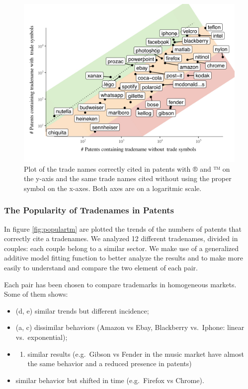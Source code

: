 \documentclass[b5paper,]{book}
\providecommand{\tightlist}{%
  \setlength{\itemsep}{0pt}\setlength{\parskip}{0pt}}
\theoremstyle{definition}
\theoremstyle{definition}
\theoremstyle{definition}
\theoremstyle{remark}
\begin{document}
\begin{figure}

{\centering \includegraphics[width=1\linewidth]{_bookdown_files/figures/TrendsMarks.001} 

}

\caption{Plot of the trade names correctly cited in patents with ® and ™ on the y-axis and the same trade names cited without using the proper symbol on the x-axes. Both axes are on a logaritmic scale.}\label{fig:tmcitedwell}
\end{figure}

\subsubsection*{The Popularity of Tradenames in
Patents}\label{the-popularity-of-tradenames-in-patents}

In figure \ref{fig:populartm} are plotted the trends of the numbers of
patents that correctly cite a tradenames. We analyzed 12 different
tradenames, divided in couples: each couple belong to a similar sector.
We make use of a generalized additive model fitting function to better
analyze the results and to make more easily to understand and compare
the two element of each pair.

Each pair has been chosen to compare trademarks in homogeneous markets.
Some of them shows:

\begin{itemize}
\item
  (d, e) similar trends but different incidence;
\item
  (a, c) dissimilar behaviors (Amazon vs Ebay, Blackberry vs.~Iphone:
  linear vs.~exponential);
\item
  \begin{enumerate}
  \def\labelenumi{(\alph{enumi})}
  \setcounter{enumi}{5}
  \tightlist
  \item
    similar results (e.g.~Gibson vs Fender in the music market have
    almost the same behavior and a reduced presence in patents)
  \end{enumerate}
\item
  similar behavior but shifted in time (e.g.~Firefox vs Chrome).
\end{itemize}
\end{document}
